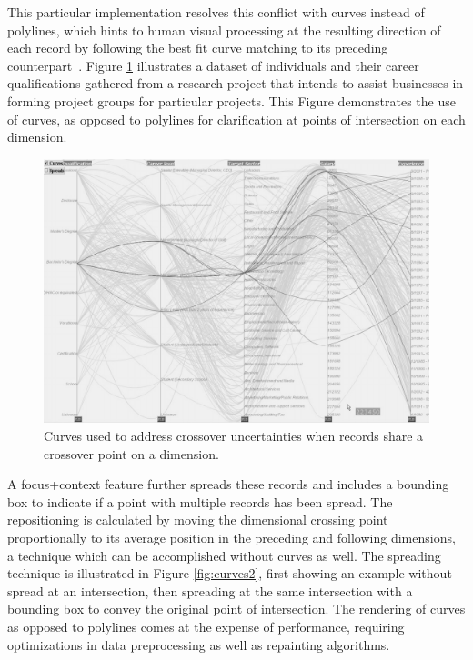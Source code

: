 \documentclass[12pt]{ucthesis}
\begin{document}
This particular implementation resolves this conflict with curves instead of polylines, which hints to human visual processing at the resulting direction of each record by following the best fit curve matching to its preceding counterpart~\cite{Graham:2003:UCE}. Figure \ref{fig:curves1} illustrates a dataset of individuals and their career qualifications gathered from a research project that intends to assist businesses in forming project groups for particular projects. This Figure demonstrates the use of curves, as opposed to polylines for clarification at points of intersection on each dimension. 

\begin{figure}[h!]
 \centering
 \includegraphics[width=\textwidth]{images/curves.jpg}
 \caption[Curves used to address crossover uncertainties.]{Curves used to address crossover uncertainties when records share a crossover point on a dimension.}
 \label{fig:curves1}
\end{figure}

A focus+context feature further spreads these records and includes a bounding box to indicate if a point with multiple records has been spread. The repositioning is calculated by moving the dimensional crossing point proportionally to its average position in the preceding and following dimensions, a technique which can be accomplished without curves as well. The spreading technique is illustrated in Figure \ref{fig:curves2}, first showing an example without spread at an intersection, then spreading at the same intersection with a bounding box to convey the original point of intersection. The rendering of curves as opposed to polylines comes at the expense of performance, requiring optimizations in data preprocessing as well as repainting algorithms.
\end{document}
